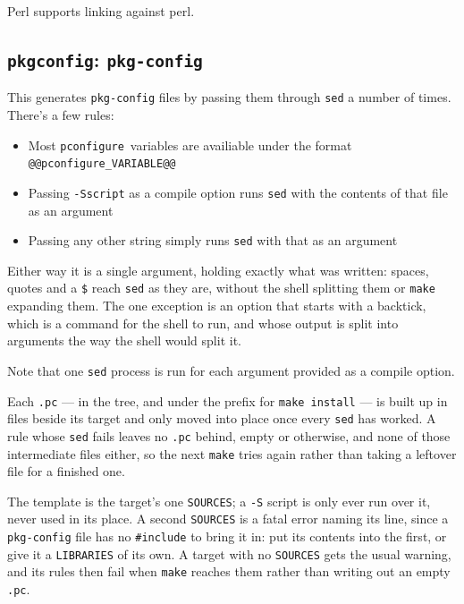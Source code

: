\documentclass{article}
\newcommand{\pconfigure}{\texttt{pconfigure}}
\begin{document}
Perl supports linking against perl.

\subsection{\texttt{pkgconfig}: \texttt{pkg-config}}

This generates \texttt{pkg-config} files by passing them through
\texttt{sed} a number of times.  There's a few rules:

\begin{itemize}
\item Most \pconfigure\ variables are availiable under the format
  \texttt{@@pconfigure\_VARIABLE@@}
\item Passing \texttt{-Sscript} as a compile option runs \texttt{sed}
  with the contents of that file as an argument
\item Passing any other string simply runs \texttt{sed} with that as
  an argument
\end{itemize}

Either way it is a single argument, holding exactly what was written:
spaces, quotes and a \texttt{\$} reach \texttt{sed} as they are,
without the shell splitting them or \texttt{make} expanding them.
The one exception is an option that starts with a backtick, which is
a command for the shell to run, and whose output is split into
arguments the way the shell would split it.

Note that one \texttt{sed} process is run for each argument provided
as a compile option.

Each \texttt{.pc} --- in the tree, and under the prefix for
\texttt{make install} --- is built up in files beside its target and
only moved into place once every \texttt{sed} has worked.  A rule
whose \texttt{sed} fails leaves no \texttt{.pc} behind, empty or
otherwise, and none of those intermediate files either, so the next
\texttt{make} tries again rather than taking a leftover file for a
finished one.

The template is the target's one \texttt{SOURCES}; a \texttt{-S}
script is only ever run over it, never used in its place.  A second
\texttt{SOURCES} is a fatal error naming its line, since a
\texttt{pkg-config} file has no \texttt{\#include} to bring it in:
put its contents into the first, or give it a \texttt{LIBRARIES} of
its own.  A target with no \texttt{SOURCES} gets the usual warning,
and its rules then fail when \texttt{make} reaches them rather than
writing out an empty \texttt{.pc}.
\end{document}
